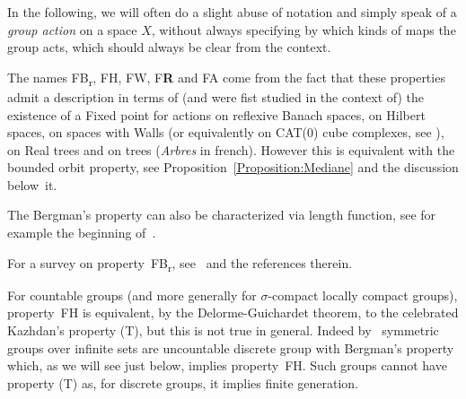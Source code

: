 \documentclass[a4paper]{article}
\newcounter{mycomment}
\newcommand{\mycomment}[2][]{\refstepcounter{mycomment}{\todo[color={green!33},size=\small]{\textbf{Commentaire [\uppercase{#1}\themycomment]:}~#2}}}
\newcommand{\GS}[1]{\mycomment[GS]{#1}}
\theoremstyle{definition}
\newtheorem{rem}[lem]{Remark}
\newcommand*{\FB}{FB\textsubscript{r}}
\newcommand*{\FH}{FH}
\newcommand*{\FW}{FW}
\newcommand*{\FA}{FA}
\newcommand*{\FR}{F\textbf{R}}
\begin{document}
In the following, we will often do a slight abuse of notation and simply speak of a \emph{group action} on a space $X$, without always specifying by which kinds of maps the group acts, which should always be clear from the context.

%
%
The names \FB, \FH, \FW,  \FR{} and \FA{} come from the fact that these properties admit a description in terms of (and were fist studied in the context of) the existence of a Fixed point for actions on reflexive Banach spaces, on Hilbert spaces, on spaces with Walls (or equivalently on CAT(0) cube complexes, see \cite{MR2197811,MR2059193}),
 on Real trees and on trees (\emph{Arbres} in french).
However this is equivalent with the bounded orbit property, see Proposition~\ref{Proposition:Mediane} and the discussion below~it.


The Bergman's property can also be characterized via length function, see for example the beginning of~\cite{MR4119107}.

For a survey on property~\FB, see~\cite{MR3382026} and the references therein.

For countable groups (and more generally for $\sigma$-compact locally compact groups), property~\FH{} is equivalent, by the Delorme-Guichardet theorem, to the celebrated Kazhdan's property (T), but this is not true in general.
Indeed by~\cite{MR2239037} symmetric groups over infinite sets are uncountable discrete group with Bergman's property which, as we will see just below, implies property~\FH.
Such groups cannot have property (T) as, for discrete groups, it implies finite generation.
\end{document}
